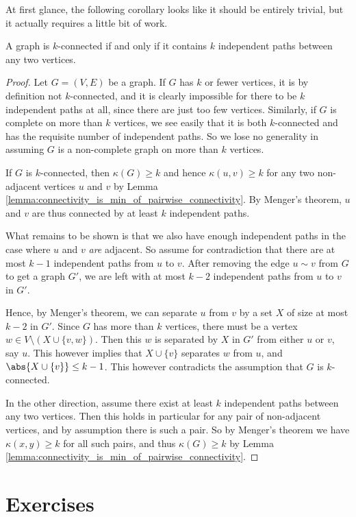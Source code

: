 \documentclass[nobib]{tufte-handout}
\begin{document}
At first glance, the following corollary looks like it should be entirely trivial, but it actually requires a little bit of work.

\begin{theorem}
  A graph is $k$-connected if and only if it contains $k$ independent paths between any two vertices.

  \begin{proof}
    Let $G = (V,E)$ be a graph. If $G$ has $k$ or fewer vertices, it is by definition not $k$-connected, and it is clearly impossible for there to be $k$ independent paths at all, since there are just too few vertices. Similarly, if $G$ is complete on more than $k$ vertices, we see easily that it is both $k$-connected and has the requisite number of independent paths. So we lose no generality in assuming $G$ is a non-complete graph on more than $k$ vertices.

    If $G$ is $k$-connected, then $\kappa(G) \geq k$ and hence $\kappa(u,v) \geq k$ for any two non-adjacent vertices $u$ and $v$ by Lemma \ref{lemma:connectivity_is_min_of_pairwise_connectivity}. By Menger's theorem, $u$ and $v$ are thus connected by at least $k$ independent paths.

    What remains to be shown is that we also have enough independent paths in the case where $u$ and $v$ \emph{are} adjacent. So assume for contradiction that there are at most $k-1$ independent paths from $u$ to $v$. After removing the edge $u \sim v$ from $G$ to get a graph $G'$, we are left with at most $k - 2$ independent paths from $u$ to $v$ in $G'$.

    Hence, by Menger's theorem, we can separate $u$ from $v$ by a set $X$ of size at most $k-2$ in $G'$. Since $G$ has more than $k$ vertices, there must be a vertex $w \in V \setminus (X \cup \{v,w\})$. Then this $w$ is separated by $X$ in $G'$ from either $u$ or $v$, say $u$. This however implies that $X \cup \{v\}$ separates $w$ from $u$, and $\abs{X \cup \{v\}} \leq k - 1$. This however contradicts the assumption that $G$ is $k$-connected.

    In the other direction, assume there exist at least $k$ independent paths between any two vertices. Then this holds in particular for any pair of non-adjacent vertices, and by assumption there is such a pair. So by Menger's theorem we have $\kappa(x,y)\geq k$ for all such pairs, and thus $\kappa(G) \geq k$ by Lemma \ref{lemma:connectivity_is_min_of_pairwise_connectivity}.
  \end{proof}
\end{theorem}

\section{Exercises}


%
%
\end{document}
